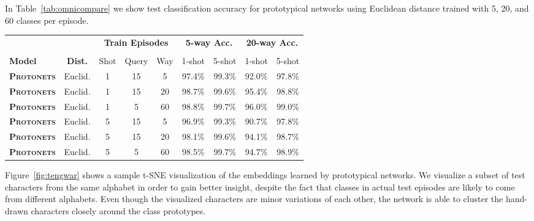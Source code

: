 \documentclass{article}
\def\abovestrut#1{\rule[0in]{0in}{#1}\ignorespaces}
\def\belowstrut#1{\rule[-#1]{0in}{#1}\ignorespaces}
\def\abovespace{\abovestrut{0.20in}}
\def\belowspace{\belowstrut{0.10in}}
\begin{document}
In Table~\ref{tab:omnicompare} we show test classification accuracy for prototypical networks using Euclidean distance trained with 5, 20, and 60 classes per episode.

\begin{table*}[h]
\caption{Additional classification accuracy results for prototypical networks on Omniglot. Configuration of training episodes is indicated by number of classes per episode (``way''), number of support points per class (``shot'') and number of query points per class (``query''). Classification accuracy was averaged over 1,000 randomly generated episodes from the test set.}
\label{tab:omnicompare}
\begin{center}
\begin{small}
\begin{tabular}{lcccccccc}
\hline
\abovespace
&&\multicolumn{3}{c}{\textbf{Train Episodes}} & \multicolumn{2}{c}{\textbf{5-way Acc.}} & \multicolumn{2}{c}{\textbf{20-way Acc.}} \\\\
\belowspace
\textbf{Model} & \textbf{Dist.} & Shot & Query & Way & 1-shot & 5-shot & 1-shot & 5-shot \\
\hline
\abovespace
\textbf{\textsc{Protonets}}     & Euclid. & 1 & 15 & 5  & 97.4\% & 99.3\% & 92.0\% & 97.8\% \\
\textbf{\textsc{Protonets}}     & Euclid. & 1 & 15 & 20 & 98.7\% & 99.6\% & 95.4\% & 98.8\% \\
\belowspace
\textbf{\textsc{Protonets}}     & Euclid. & 1 & 5  & 60 & 98.8\% & 99.7\% & 96.0\% & 99.0\%\\
\hline
\abovespace
\textbf{\textsc{Protonets}}     & Euclid. & 5 & 15 & 5  & 96.9\% & 99.3\% & 90.7\% & 97.8\% \\
\textbf{\textsc{Protonets}}     & Euclid. & 5 & 15 & 20 & 98.1\% & 99.6\% & 94.1\% & 98.7\% \\
\belowspace
\textbf{\textsc{Protonets}}     & Euclid. & 5 & 5 & 60 & 98.5\% & 99.7\% & 94.7\% & 98.9\% \\
\hline
\end{tabular}
\end{small}
\end{center}
\end{table*}

Figure~\ref{fig:tengwar} shows a sample t-SNE visualization \citep{maaten2008visualizing} of the embeddings learned by prototypical networks. We visualize a subset of test characters from the same alphabet in order to gain better insight, despite the fact that classes in actual test episodes are likely to come from different alphabets. Even though the visualized characters are minor variations of each other, the network is able to cluster the hand-drawn characters closely around the class prototypes. 
\end{document}
